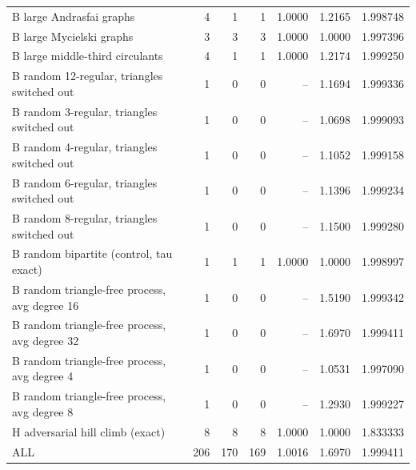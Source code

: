 \begin{tabular}{lrrrrrr}
B large Andrasfai graphs & 4 & 1 & 1 & 1.0000 & 1.2165 & 1.998748 \\
B large Mycielski graphs & 3 & 3 & 3 & 1.0000 & 1.0000 & 1.997396 \\
B large middle-third circulants & 4 & 1 & 1 & 1.0000 & 1.2174 & 1.999250 \\
B random 12-regular, triangles switched out & 1 & 0 & 0 & -- & 1.1694 & 1.999336 \\
B random 3-regular, triangles switched out & 1 & 0 & 0 & -- & 1.0698 & 1.999093 \\
B random 4-regular, triangles switched out & 1 & 0 & 0 & -- & 1.1052 & 1.999158 \\
B random 6-regular, triangles switched out & 1 & 0 & 0 & -- & 1.1396 & 1.999234 \\
B random 8-regular, triangles switched out & 1 & 0 & 0 & -- & 1.1500 & 1.999280 \\
B random bipartite (control, tau exact) & 1 & 1 & 1 & 1.0000 & 1.0000 & 1.998997 \\
B random triangle-free process, avg degree 16 & 1 & 0 & 0 & -- & 1.5190 & 1.999342 \\
B random triangle-free process, avg degree 32 & 1 & 0 & 0 & -- & 1.6970 & 1.999411 \\
B random triangle-free process, avg degree 4 & 1 & 0 & 0 & -- & 1.0531 & 1.997090 \\
B random triangle-free process, avg degree 8 & 1 & 0 & 0 & -- & 1.2930 & 1.999227 \\
H adversarial hill climb (exact) & 8 & 8 & 8 & 1.0000 & 1.0000 & 1.833333 \\
\midrule
ALL & 206 & 170 & 169 & 1.0016 & 1.6970 & 1.999411 \\
\bottomrule
\end{tabular}
